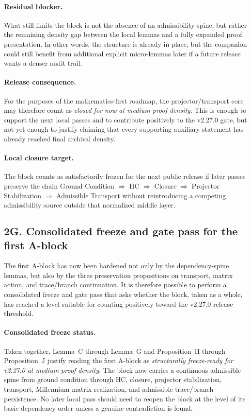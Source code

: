 \paragraph{Residual blocker.}
What still limits the block is not the absence of an admissibility spine, but
rather the remaining density gap between the local lemmas and a fully expanded
proof presentation. In other words, the structure is already in place, but the
companion could still benefit from additional explicit micro-lemmas later if a
future release wants a denser audit trail.

\paragraph{Release consequence.}
For the purposes of the mathematics-first roadmap, the projector/transport core
may therefore count as \emph{closed for now at medium proof density}. This is
enough to support the next local passes and to contribute positively to the
v2.27.0 gate, but not yet enough to justify claiming that every supporting
auxiliary statement has already reached final archival density.

\paragraph{Local closure target.}
The block counts as satisfactorily frozen for the next public release if later
passes preserve the chain
Ground Condition $\Rightarrow$ HC $\Rightarrow$ Closure $\Rightarrow$
Projector Stabilization $\Rightarrow$ Admissible Transport
without reintroducing a competing admissibility source outside that normalized
middle layer.



\subsection*{2G. Consolidated freeze and gate pass for the first A-block}
The first A-block has now been hardened not only by the dependency-spine lemmas,
but also by the three preservation propositions on transport, matrix action, and
trace/branch continuation. It is therefore possible to perform a consolidated
freeze and gate pass that asks whether the block, taken as a whole, has reached
a level suitable for counting positively toward the v2.27.0 release threshold.

\paragraph{Consolidated freeze status.}
Taken together, Lemma~C through Lemma~G and Proposition~H through Proposition~J
justify reading the first A-block as \emph{structurally freeze-ready for
v2.27.0 at medium proof density}. The block now carries a continuous admissible
spine from ground condition through HC, closure, projector stabilization,
transport, Millennium-matrix realization, and admissible trace/branch
persistence. No later local pass should need to reopen the block at the level
of its basic dependency order unless a genuine contradiction is found.

